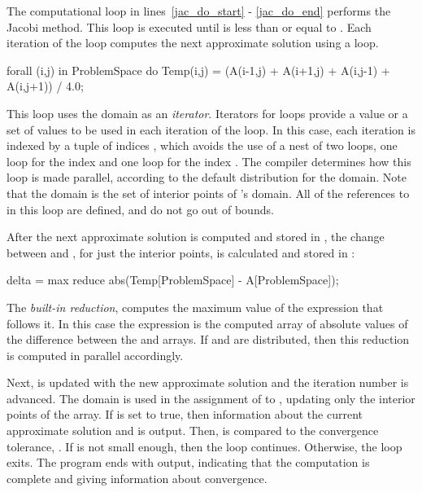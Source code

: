 The computational loop in lines~\ref{jac_do_start} - \ref{jac_do_end}  
performs the Jacobi method.
This loop is executed until  is less than or equal to .
Each iteration of the  loop computes the next approximate
solution using a  loop.   
\begin{chapel}
    forall (i,j) in ProblemSpace do
      Temp(i,j) = (A(i-1,j) + A(i+1,j) + A(i,j-1) + A(i,j+1)) / 4.0;
\end{chapel}
This loop 
uses the  domain as an {\em iterator}.  Iterators
for loops provide a value or a set of values to be used in each iteration
of the loop.  In this case, each iteration 
is indexed by a tuple of indices , which avoids the use of
a nest of two loops, one loop for the index  and one loop for the
index .  The compiler determines how this loop is made parallel, according
to the default distribution for the  domain.   
Note that the  domain is the set of interior points of 
's domain.  All of the references to  in this loop are
defined, and do not go out of bounds.  

After the next approximate solution is computed and stored in ,
the change between  and , for just the interior points, is 
calculated and stored in :  
\begin{chapel}
    delta = max reduce abs(Temp[ProblemSpace] - A[ProblemSpace]);
\end{chapel}
The {\em built-in reduction}, 
computes the maximum value of the expression that follows it.  In this case
the expression is the computed array of absolute values of the difference
between the  and  arrays.  If
 and  are distributed, then this reduction is computed in 
parallel accordingly.  

Next,  is updated with the new approximate solution and the iteration
number is advanced.  The domain  is used in the assignment
of  to , updating only the interior points of the array.
If  is set to true, then information about
the current approximate solution and  is output.  Then, 
is compared to the convergence tolerance, .  If  is
not small enough, then the  loop continues.  Otherwise, the loop exits.  
The program ends with output, indicating that the computation is complete
and giving information about convergence.  

